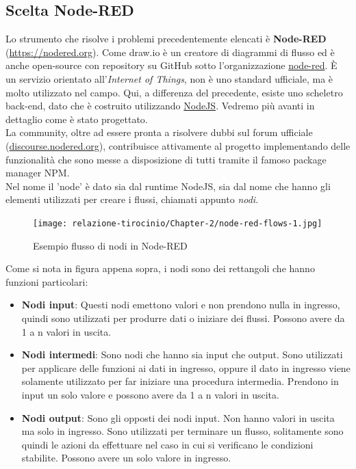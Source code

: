 \documentclass[a4paper,10pt]{memoir}
\begin{document}
\subsection{Scelta Node-RED}
Lo strumento che risolve i problemi precedentemente elencati è \textbf{Node-RED} (\href{https://nodered.org}{https://nodered.org}).
Come draw.io è un creatore di diagrammi di flusso ed è anche open-source con repository su GitHub sotto l'organizzazione \href{https://github.com/node-red}{node-red}. È un servizio orientato all'\textit{Internet of Things}, non è uno standard ufficiale, ma è molto utilizzato nel campo.
Qui, a differenza del precedente, esiste uno scheletro back-end, dato che è costruito utilizzando \href{https://nodejs.org}{NodeJS}. Vedremo più avanti in dettaglio come è stato progettato.\\
La community, oltre ad essere pronta a risolvere dubbi sul forum ufficiale (\href{https://discourse.nodered.org}{discourse.nodered.org}), contribuisce attivamente al progetto implementando delle funzionalità che sono messe a disposizione di tutti tramite il famoso package manager NPM.
\\
Nel nome il 'node' è dato sia dal runtime NodeJS, sia dal nome che hanno gli elementi utilizzati per creare i flussi, chiamati appunto \textit{nodi}.
\begin{figure}[H]
\caption{Esempio flusso di nodi in Node-RED}
\label{fig:node-red-flows-example1}
\texttt{[image: relazione-tirocinio/Chapter-2/node-red-flows-1.jpg]}
\end{figure}
Come si nota in figura appena sopra, i nodi sono dei rettangoli che hanno funzioni particolari:
\begin{itemize}
    \item \textbf{Nodi input}: Questi nodi emettono valori e non prendono nulla in ingresso, quindi sono utilizzati per produrre dati o iniziare dei flussi. Possono avere da 1 a n valori in uscita.
    \item \textbf{Nodi intermedi}: Sono nodi che hanno sia input che output. Sono utilizzati per applicare delle funzioni ai dati in ingresso, oppure il dato in ingresso viene solamente utilizzato per far iniziare una procedura intermedia. Prendono in input un solo valore e possono avere da 1 a n valori in uscita.
    \item \textbf{Nodi output}: Sono gli opposti dei nodi input. Non hanno valori in uscita ma solo in ingresso. Sono utilizzati per terminare un flusso, solitamente sono quindi le azioni da effettuare nel caso in cui si verificano le condizioni stabilite. Possono avere un solo valore in ingresso.
\end{itemize}
\end{document}
